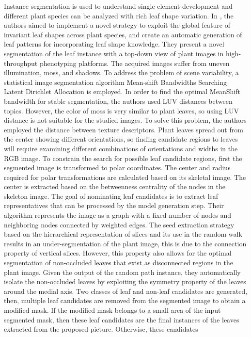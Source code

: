 Instance segmentation is used to understand single element development and different plant species can be analyzed with rich leaf shape variation. In \cite{9411981},
the authors aimed to implement a novel strategy to exploit the global feature of invariant leaf shapes across plant species,
and create an automatic generation of leaf patterns for incorporating leaf shape knowledge.
They present a novel segmentation of the leaf instance with a top-down view of plant images in high-throughput phenotyping platforms.
The acquired images suffer from uneven illumination, moss, and shadows. To address the problem of scene variability, a statistical
image segmentation algorithm Mean-shift Bandwidths Searching Latent Dirichlet Allocation is employed. In order to find the optimal
MeanShift bandwidth for stable segmentation, the authors used LUV distances between topics. However, the color of moss is very similar
to plant leaves, so using LUV distance is not suitable for the studied images. To solve this problem, the authors employed the distance between
texture descriptors.
Plant leaves spread out from the center showing different orientations, so finding candidate regions to leaves will require examining different
combinations of orientations and widths in the RGB image. To constrain the search for possible leaf candidate regions, first the segmented image
is transformed to polar coordinates. The center and radius required for polar transformations are calculated based on its skeletal image. The center
is extracted based on the betweenness centrality of the nodes in the skeleton image. The goal of nominating leaf candidates is to extract leaf representatives
that can be processed by the model generation step. Their algorithm represents the image as a graph with a fixed number of nodes and neighboring nodes
connected by weighted edges. The seed extraction strategy based on the hierarchical representation of slices and its use in the random walk results in
an under-segmentation of the plant image, this is due to the connection property of vertical slices. However, this property also allows for the optimal
segmentation of non-occluded leaves that exist as disconnected regions in the plant image. Given the output of the random path instance, they automatically
isolate the non-occluded leaves by exploiting the symmetry property of the leaves around the medial axis. Two classes of leaf and non-leaf candidates are
generated, then, multiple leaf candidates are removed from the segmented image to obtain a modified mask. If the modified mask belongs to a small area of
the input segmented mask, then these leaf candidates are the final instances of the leaves extracted from the proposed picture. Otherwise, these candidates
